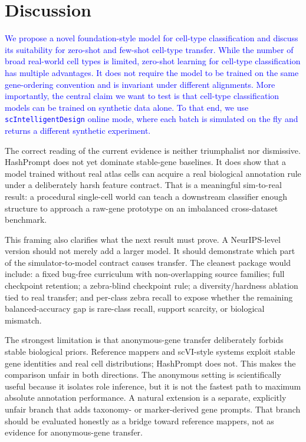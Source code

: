 \documentclass{article}
\newcommand{\phflo}[1]{\textcolor{blue}{#1}}
\begin{document}
\section{Discussion}

\phflo{We propose a novel foundation-style model for cell-type classification and discuss its suitability for zero-shot and few-shot cell-type transfer. While the number of broad real-world cell types is limited, zero-shot learning for cell-type classification has multiple advantages. It does not require the model to be trained on the same gene-ordering convention and is invariant under different alignments. More importantly, the central claim we want to test is that cell-type classification models can be trained on synthetic data alone. To that end, we use \texttt{scIntelligentDesign} online mode, where each batch is simulated on the fly and returns a different synthetic experiment.}

The correct reading of the current evidence is neither triumphalist nor dismissive. HashPrompt does not yet dominate stable-gene baselines. It does show that a model trained without real atlas cells can acquire a real biological annotation rule under a deliberately harsh feature contract. That is a meaningful sim-to-real result: a procedural single-cell world can teach a downstream classifier enough structure to approach a raw-gene prototype on an imbalanced cross-dataset benchmark.

This framing also clarifies what the next result must prove. A NeurIPS-level version should not merely add a larger model. It should demonstrate which part of the simulator-to-model contract causes transfer. The cleanest package would include: a fixed bug-free curriculum with non-overlapping source families; full checkpoint retention; a zebra-blind checkpoint rule; a diversity/hardness ablation tied to real transfer; and per-class zebra recall to expose whether the remaining balanced-accuracy gap is rare-class recall, support scarcity, or biological mismatch.

The strongest limitation is that anonymous-gene transfer deliberately forbids stable biological priors. Reference mappers and scVI-style systems exploit stable gene identities and real cell distributions; HashPrompt does not. This makes the comparison unfair in both directions. The anonymous setting is scientifically useful because it isolates role inference, but it is not the fastest path to maximum absolute annotation performance. A natural extension is a separate, explicitly unfair branch that adds taxonomy- or marker-derived gene prompts. That branch should be evaluated honestly as a bridge toward reference mappers, not as evidence for anonymous-gene transfer.
\end{document}
